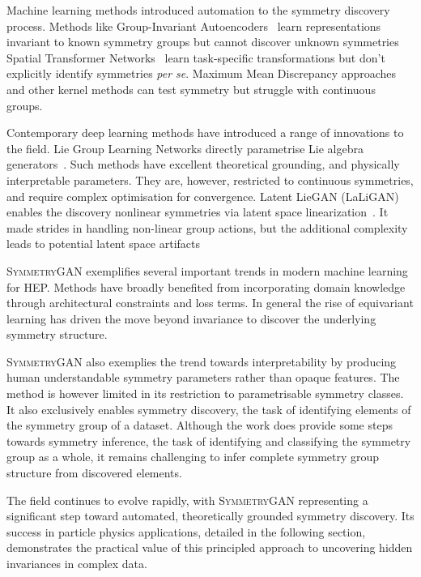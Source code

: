         Machine learning methods introduced automation to the symmetry discovery process.
        Methods like Group-Invariant Autoencoders~\cite{Hao2023LorentzAutoencoders} learn representations invariant to known symmetry groups but cannot discover unknown symmetries
        Spatial Transformer Networks~\cite{Jaderberg2015SpatialNetworks} learn task-specific transformations but don't explicitly identify symmetries \textit{per se}.
        Maximum Mean Discrepancy approaches~\cite{tolstikhin_minimax_2016} and other kernel methods can test symmetry but struggle with continuous groups.

        Contemporary deep learning methods have introduced a range of innovations to the field.
        Lie Group Learning Networks directly parametrise Lie algebra generators~\cite{gabel_learning_2023}.
        Such methods have excellent theoretical grounding, and physically interpretable parameters.
        They are, however, restricted to continuous symmetries, and require complex optimisation for convergence.
        Latent LieGAN (LaLiGAN) enables the discovery nonlinear symmetries via latent space linearization~\cite{yang_latent_2024}.
        It made strides in handling non-linear group actions, but the additional complexity leads to potential latent space artifacts

        \textsc{SymmetryGAN} exemplifies several important trends in modern machine learning for HEP.
        Methods have broadly benefited from incorporating domain knowledge through architectural constraints and loss terms.
        In general the rise of equivariant learning has driven the move beyond invariance to discover the underlying symmetry structure.
        
        \textsc{SymmetryGAN} also exemplies the trend towards interpretability by producing human understandable symmetry parameters rather than opaque features.
        The method is however limited in its restriction to parametrisable symmetry classes.
        It also exclusively enables symmetry discovery, the task of identifying elements of the symmetry group of a dataset.
        Although the work does provide some steps towards symmetry inference, the task of identifying and classifying the symmetry group as a whole, it remains challenging to infer complete symmetry group structure from discovered elements.
        
        The field continues to evolve rapidly, with \textsc{SymmetryGAN} representing a significant step toward automated, theoretically grounded symmetry discovery.
        Its success in particle physics applications, detailed in the following section, demonstrates the practical value of this principled approach to uncovering hidden invariances in complex data.

